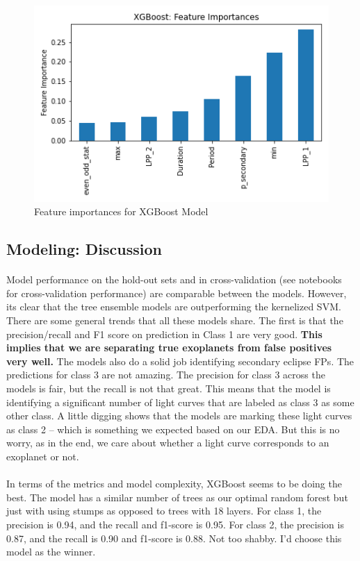 \documentclass{article}
\begin{document}
\begin{figure}[H]
	\begin{center}
		\includegraphics[totalheight=6cm]{figures/xgb_feature_imp.png}
	\end{center}
	\caption{Feature importances for XGBoost Model}
\end{figure}

\subsection{Modeling: Discussion}
\paragraph{} Model performance on the hold-out sets and in cross-validation (see notebooks for cross-validation performance) are comparable between the models. However, its clear that the tree ensemble models are outperforming the kernelized SVM. There are some general trends that all these models share. The first is that the precision/recall and F1 score on prediction in Class 1 are very good. \textbf{This implies that we are separating true exoplanets from false positives very well.} The models also do a solid job identifying secondary eclipse FPs. The predictions for class 3 are not amazing. The precision for class 3 across the models is fair, but the recall is not that great. This means that the model is identifying a significant number of light curves that are labeled as class 3 as some other class. A little digging shows that the models are marking these light curves as class 2 -- which is something we expected based on our EDA. But this is no worry, as in the end, we care about whether a light curve corresponds to an exoplanet or not.
\paragraph{}
In terms of the metrics and model complexity, XGBoost seems to be doing the best. The model has a similar number of trees as our optimal random forest but just with using stumps as opposed to trees with 18 layers. For class 1, the precision is 0.94, and the recall and f1-score is 0.95. For class 2, the precision is 0.87, and the recall is 0.90 and f1-score is 0.88. Not too shabby. I'd choose this model as the winner.
\end{document}
